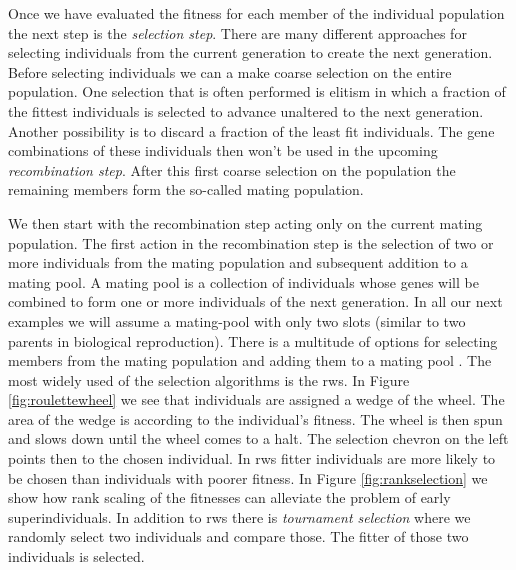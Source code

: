 Once we have evaluated the fitness for each member of the \gls{individual} population the next step is the \textit{selection step}. There are many different approaches for selecting \glspl{individual} from the current generation to create the next generation. Before selecting \glspl{individual} we can a make coarse selection on the entire population. One selection that is often performed is \gls{elitism} in which a fraction of the fittest individuals is selected to advance unaltered to the next generation. Another possibility is to discard a fraction of the least fit \glspl{individual}. The \gls{gene} combinations of these  \glspl{individual} then won't be used in the upcoming \textit{recombination step}. After this first coarse selection on the population the remaining members form the so-called mating population.

We then start with the recombination step acting only on the current mating population. The first action in the recombination step is the selection of two or more individuals from the mating population and subsequent addition to a mating pool. A mating pool is a collection of \glspl{individual} whose \glspl{gene} will be combined to form one or more \glspl{individual} of the next generation. In all our next examples we will assume a mating-pool with only two slots (similar to two parents in biological reproduction). There is a multitude of options for selecting members from the mating population and adding them to a mating pool \citep[for an overview see][]{Goldberg91acomparative}. The most widely used of the selection algorithms is the \gls{rws}. In Figure \ref{fig:roulettewheel} we see that \glspl{individual} are assigned a wedge of the wheel. The area of the wedge is according to the \gls{individual}'s fitness. The wheel is then spun and slows down until the wheel comes to a halt. The selection chevron on the left points then to the chosen \gls{individual}. In \gls{rws} fitter \glspl{individual} are more likely to be chosen than \glspl{individual} with poorer \gls{fitness}. In Figure \ref{fig:rankselection} we show how rank scaling of the fitnesses can alleviate the problem of early \glspl{superindividual}. In addition to \gls{rws} there is \textit{tournament selection} where we randomly select two individuals and compare those. The fitter of those two individuals is selected. 

